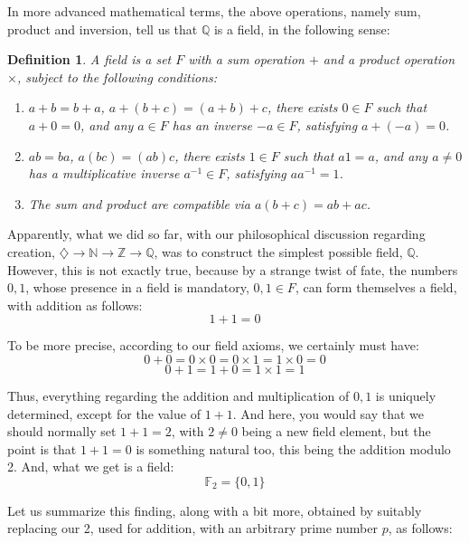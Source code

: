\documentclass[12pt]{amsbook}
\newtheorem{definition}[theorem]{Definition}
\begin{document}
\bigskip

In more advanced mathematical terms, the above operations, namely sum, product and inversion, tell us that $\mathbb Q$ is a field, in the following sense: 


\begin{definition}
A field is a set $F$ with a sum operation $+$ and a product operation $\times$, subject to the following conditions:
\begin{enumerate}
\item $a+b=b+a$, $a+(b+c)=(a+b)+c$, there exists $0\in F$ such that $a+0=0$, and any $a\in F$ has an inverse $-a\in F$, satisfying $a+(-a)=0$.

\item $ab=ba$, $a(bc)=(ab)c$, there exists $1\in F$ such that $a1=a$, and any $a\neq0$ has a multiplicative inverse $a^{-1}\in F$, satisfying $aa^{-1}=1$.

\item The sum and product are compatible via $a(b+c)=ab+ac$.
\end{enumerate}
\end{definition}

Apparently, what we did so far, with our philosophical discussion regarding creation, $\diamondsuit\to\mathbb N\to\mathbb Z\to\mathbb Q$, was to construct the simplest possible field, $\mathbb Q$. However, this is not exactly true, because by a strange twist of fate, the numbers $0,1$, whose presence in a field is mandatory, $0,1\in F$, can form themselves a field, with addition as follows:
$$1+1=0$$

To be more precise, according to our field axioms, we certainly must have:
$$0+0=0\times0=0\times1=1\times0=0$$
$$0+1=1+0=1\times1=1$$

Thus, everything regarding the addition and multiplication of $0,1$ is uniquely determined, except for the value of $1+1$. And here, you would say that we should normally set $1+1=2$, with $2\neq0$ being a new field element, but the point is that $1+1=0$ is something natural too, this being the addition modulo 2. And, what we get is a field:
$$\mathbb F_2=\{0,1\}$$

Let us summarize this finding, along with a bit more, obtained by suitably replacing our 2, used for addition, with an arbitrary prime number $p$, as follows:

\end{document}
